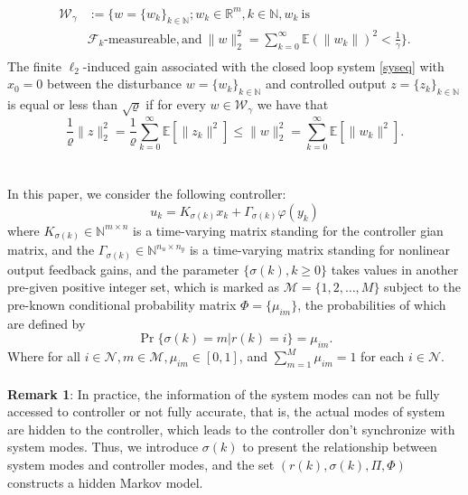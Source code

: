 \documentclass[conference]{IEEEtran}
\begin{document}
\begin{equation}
	\begin{split}
		\mathcal{W}_{\gamma}&:=\{w=\{w_k\}_{k\in\mathbb{N}};w_k\in\mathbb{R}^{m}, k\in\mathbb{N}, w_k \ \text{is} \\
		&\mathcal{F}_k\text{-measureable}, \text{and}\  \|w\|^2_2=\sum_{k=0}^{\infty}\mathbb{E}(\|w_k\|)^2<\frac{1}{\gamma}\}.\\
	\end{split}
\end{equation}
The finite $\ell_2$-induced gain associated with the closed loop system \eqref{syseq} with $x_0=0$ between the disturbance $w=\{w_k\}_{k\in\mathbb{N}}$ and controlled output $z=\{z_k\}_{k\in\mathbb{N}}$ is equal or less than $\sqrt{\varrho}$ if for every $w\in\mathcal{W}_{\gamma}$ we have that
\begin{equation}
\frac{1}{\varrho}\|z\|^2_2=\frac{1}{\varrho}\sum_{k=0}^{\infty}\mathbb{E}\left[\|z_k\|^2\right] \leq \|w\|^2_2=\sum_{k=0}^{\infty}\mathbb{E}\left[\|w_k\|^2\right].
\end{equation}\\
\\
In this paper, we consider the following controller:
\begin{equation}\label{asycontroller}
u_k=K_{\sigma(k)}x_k+\varGamma_{\sigma(k)}\varphi(y_k) 
\end{equation}
where $K_{\sigma(k)}\in \mathbb{N}^{m\times n}$ is a time-varying matrix standing for the controller gian matrix, and the $\varGamma_{\sigma(k)}\in \mathbb{N}^{n_u\times n_y}$ is a time-varying matrix standing for nonlinear output feedback gains, and the parameter $\{\sigma(k),k\geq0\}$ takes values in another pre-given positive integer set, which is marked as $\mathcal{M}=\{1,2,\dots,M\}$ subject to the pre-known conditional probability matrix $\varPhi=\{\mu_{im} \}$, the probabilities of which are defined by
\begin{equation}
\Pr\{\sigma(k)=m|r(k)=i\}=\mu_{im}.
\end{equation}
Where for all $i\in\mathcal{N}, m\in\mathcal{M}, \mu_{im}\in [0,1]$, and $\sum_{m=1}^{M}\mu_{im}=1$ for each $i\in\mathcal{N}$.\\
\\
\textbf{Remark 1}: In practice, the information of the system modes can not be fully accessed to controller or not fully accurate, that is, the actual modes of system are hidden to the controller, which leads to the controller don't synchronize with system modes. Thus, we introduce $\sigma(k)$ to present the relationship between system modes and controller modes, and the set $(r(k),\sigma(k),\varPi,\varPhi)$ constructs a hidden Markov model. \\
\end{document}
